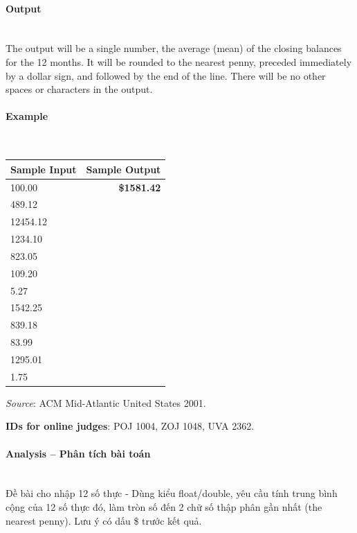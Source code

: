 \documentclass{article}
\begin{document}
\paragraph{Output}\mbox{} \\

The output will be a single number, the average (mean) of the closing balances for the 12 months. It will be rounded to the nearest penny, preceded immediately by a dollar sign, and followed by the end of the line. There will be no other spaces or characters in the output.

\paragraph{Example}\mbox{} \\

\begin{table}[h]
    \centering
    \begin{tabular}{|l|r|}
        \hline
        \textbf{Sample Input} & \textbf{Sample Output} \\
        \hline
        100.00    &  \textbf{\$1581.42} \\ 
        489.12    &  \\ 
        12454.12  &  \\ 
        1234.10   &  \\ 
        823.05    &  \\ 
        109.20    &  \\ 
        5.27      &  \\ 
        1542.25   &  \\ 
        839.18    &  \\ 
        83.99     &  \\ 
        1295.01   &  \\ 
        1.75      &  \\ \hline
    \end{tabular}
\end{table}

\textit{Source}: ACM Mid-Atlantic United States 2001.

\textbf{IDs for online judges}: POJ 1004, ZOJ 1048, UVA 2362.


\paragraph{Analysis -- Phân tích bài toán} \mbox{} \\

Đề bài cho nhập 12 số thực - Dùng kiểu float/double, yêu cầu tính trung bình cộng của 12 số thực đó, làm tròn số đến 2 chữ số thập phân gần nhất (the nearest penny). Lưu ý có dấu \$ trước kết quả.
\end{document}
